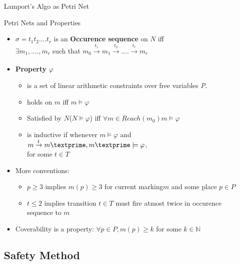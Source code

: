 \documentclass{beamer}
\begin{document}
\begin{frame}{Lamport's Algo as Petri Net}
\begin{tikzpicture}[x=0.65pt,y=0.65pt,yscale=-1,xscale=1]
\end{tikzpicture}
\end{frame}


\begin{frame}{Petri Nets and Properties}
  \begin{itemize}
    \item  $\sigma = t_1t_2....t_r$ is an \textbf{Occurence sequence} on $N$ iff \\
      $\exists m_1,....,m_r$ such that $m_0\xrightarrow[]{t_1}m_1 \xrightarrow[]{t_2}....\xrightarrow[]{t_r}m_r $
    \item \textbf{Property $\varphi$} 
    \begin{itemize}
      \item is a set of linear arithmetic constraints over free variables \textit{P}.
      \item holds on $m$ iff $m \models \varphi $
      \item Satisfied by $N$($N\models \varphi$) iff $\forall m \in Reach(m_0) m\models \varphi$
      \item is inductive if whenever $m\models \varphi$ and $m\xrightarrow[]{t}m\textprime ,m\textprime\models\varphi$,\\
       for some $t \in T$
    \end{itemize}
    \item More conventions:
    \begin{itemize}
      \item $p \geq 3$ implies $m(p) \geq 3$ for current marking$m$ and some place $p \in P$
      \item $t \leq 2$ implies transition $t \in T$ must fire atmost twice in occurence sequence to $m$
    \end{itemize}
    \item Coverability is a property: $\forall p \in P, m(p) \geq k$ for some $k \in \mathbb{N}$
  \end{itemize}
\end{frame}
\subsection{Safety Method}
\end{document}
